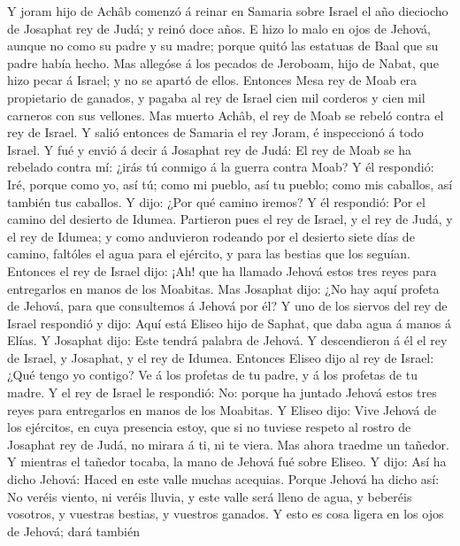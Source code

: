  Y joram hijo de Achâb comenzó á reinar en Samaria sobre
Israel el año dieciocho de Josaphat rey de Judá; y reinó doce años.
 E hizo lo malo en ojos de Jehová, aunque no como su padre y
su madre; porque quitó las estatuas de Baal que su padre había hecho.
 Mas allegóse á los pecados de Jeroboam, hijo de Nabat, que
hizo pecar á Israel; y no se apartó de ellos.  Entonces Mesa
rey de Moab era propietario de ganados, y pagaba al rey de Israel cien
mil corderos y cien mil carneros con sus vellones.  Mas
muerto Achâb, el rey de Moab se rebeló contra el rey de Israel.
 Y salió entonces de Samaria el rey Joram, é inspeccionó á
todo Israel.  Y fué y envió á decir á Josaphat rey de Judá:
El rey de Moab se ha rebelado contra mí: ¿irás tú conmigo á la guerra
contra Moab? Y él respondió: Iré, porque como yo, así tú; como mi
pueblo, así tu pueblo; como mis caballos, así también tus caballos.
 Y dijo: ¿Por qué camino iremos? Y él respondió: Por el
camino del desierto de Idumea.  Partieron pues el rey de
Israel, y el rey de Judá, y el rey de Idumea; y como anduvieron rodeando
por el desierto siete días de camino, faltóles el agua para el ejército,
y para las bestias que los seguían.  Entonces el rey de
Israel dijo: ¡Ah! que ha llamado Jehová estos tres reyes para
entregarlos en manos de los Moabitas.  Mas Josaphat dijo:
¿No hay aquí profeta de Jehová, para que consultemos á Jehová por él? Y
uno de los siervos del rey de Israel respondió y dijo: Aquí está Eliseo
hijo de Saphat, que daba agua á manos á Elías.  Y Josaphat
dijo: Este tendrá palabra de Jehová. Y descendieron á él el rey de
Israel, y Josaphat, y el rey de Idumea.  Entonces Eliseo
dijo al rey de Israel: ¿Qué tengo yo contigo? Ve á los profetas de tu
padre, y á los profetas de tu madre. Y el rey de Israel le respondió:
No: porque ha juntado Jehová estos tres reyes para entregarlos en manos
de los Moabitas.  Y Eliseo dijo: Vive Jehová de los
ejércitos, en cuya presencia estoy, que si no tuviese respeto al rostro
de Josaphat rey de Judá, no mirara á ti, ni te viera.  Mas
ahora traedme un tañedor. Y mientras el tañedor tocaba, la mano de
Jehová fué sobre Eliseo.  Y dijo: Así ha dicho Jehová:
Haced en este valle muchas acequias.  Porque Jehová ha
dicho así: No veréis viento, ni veréis lluvia, y este valle será lleno
de agua, y beberéis vosotros, y vuestras bestias, y vuestros ganados.
 Y esto es cosa ligera en los ojos de Jehová; dará también
